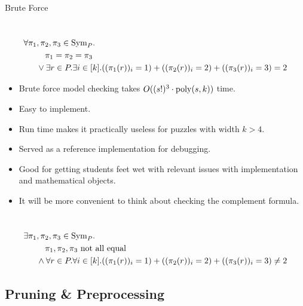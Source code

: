 \documentclass[t,10pt,
mathserif,xcolor=dvipsnames]{beamer}
\begin{document}
\begin{myframe}{Brute Force}

  ~\\[-7ex]
  \begin{equation*}
    \begin{aligned}
      \forall \pi_1&,\pi_2, \pi_3 \in \mathrm{Sym}_{P}.\\
      &~~~\pi_1 = \pi_2 = \pi_3\\
      &\vee \exists r \in P. \exists i \in [k]. ((\pi_1(r))_i = 1) + ((\pi_2(r))_i = 2) + ((\pi_3(r))_i = 3) = 2
    \end{aligned}
  \end{equation*}
  
  \begin{itemize}
  \item Brute force model checking takes $O((s!)^3\cdot\mathrm{poly}(s,k))$ time.
  \item Easy to implement.
  \item Run time makes it practically useless for puzzles with width $k > 4$.
  \item Served as a reference implementation for debugging.
  \item Good for getting students feet wet with relevant issues with
    implementation and mathematical objects.
  \item It will be more convenient to think about checking the complement formula.
  \end{itemize}

  ~\\[-5ex]
  \begin{equation*}
    \begin{aligned}
      \exists \pi_1&,\pi_2, \pi_3 \in \mathrm{Sym}_{P}.\\
      &~~~\pi_1, \pi_2, \pi_3 \text{ not all equal}\\
      &\wedge \forall r \in P. \forall i \in [k]. ((\pi_1(r))_i = 1) + ((\pi_2(r))_i = 2) + ((\pi_3(r))_i = 3) \neq 2
    \end{aligned}
  \end{equation*}
  
\end{myframe}

\subsection{Pruning \& Preprocessing}
\end{document}
